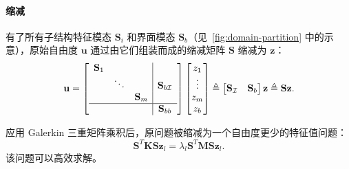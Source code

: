 \paragraph{缩减}
\label{sec:reducing}
有了所有子结构特征模态 $\mathbf{S}_i$ 和界面模态 $\mathbf{S}_b$（见~\cref{fig:domain-partition} 中的示意），原始自由度 $\mathbf{u}$ 通过由它们组装而成的缩减矩阵 $\mathbf{S}$ 缩减为 $\mathbf{z}$：
\begin{equation}
  \mathbf{u} =
  \left[
    \begin{array}{ccc|c}
  \mathbf{S}_1 &&&\\
      &\ddots && \mathbf{S}_{b\mathcal{I}}\\
      &&\mathbf{S}_m &\\\hline
      &&&\mathbf{S}_{bb}
    \end{array}
  \right]
  \begin{bmatrix}
  z_1 \\\vdots\\ z_m\\z_b
  \end{bmatrix}
  \triangleq
  \begin{bmatrix}
    \mathbf{S}_{\mathcal{I}} & \mathbf{S}_{b}
  \end{bmatrix}\mathbf{z}
  \triangleq \mathbf{S} \mathbf{z}.
  \label{eq:redmat}
\end{equation}

应用 Galerkin 三重矩阵乘积后，原问题被缩减为一个自由度更少的特征值问题：
\begin{equation}
  \mathbf{S}^T\mathbf{K} \mathbf{S} \mathbf{z}_l =\lambda_l \mathbf{S}^T \mathbf{M} \mathbf{S} \mathbf{z}_l.
  \label{eq:reduced-matrix-pencil}
\end{equation}
该问题可以高效求解。

